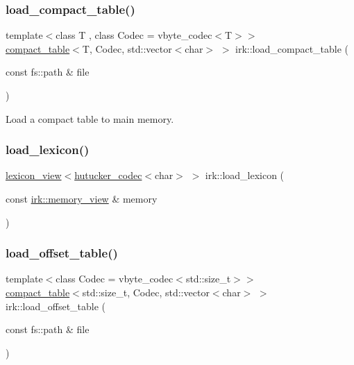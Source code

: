 \mbox{\label{namespaceirk_af5d69d1a8b720ed220cac2ba35bf704f}} 
\subsubsection{\texorpdfstring{load\+\_\+compact\+\_\+table()}{load\_compact\_table()}}
{\footnotesize\ttfamily template$<$class T , class Codec  = vbyte\+\_\+codec$<$\+T$>$$>$ \\
\mbox{\hyperlink{classirk_1_1compact__table}{compact\+\_\+table}}$<$T, Codec, std\+::vector$<$char$>$ $>$ irk\+::load\+\_\+compact\+\_\+table (\begin{DoxyParamCaption}\item[{const fs\+::path \&}]{file }\end{DoxyParamCaption})}



Load a compact table to main memory. 

\mbox{\label{namespaceirk_a34aaa6d3890f73c7d082ddbd78340875}} 
\subsubsection{\texorpdfstring{load\+\_\+lexicon()}{load\_lexicon()}}
{\footnotesize\ttfamily \mbox{\hyperlink{namespaceirk_ab1814afdb97c1b326d1d549beedf9be8}{lexicon\+\_\+view}}$<$\mbox{\hyperlink{classirk_1_1hutucker__codec}{hutucker\+\_\+codec}}$<$char$>$ $>$ irk\+::load\+\_\+lexicon (\begin{DoxyParamCaption}\item[{const \mbox{\hyperlink{classirk_1_1memory__view}{irk\+::memory\+\_\+view}} \&}]{memory }\end{DoxyParamCaption})\hspace{0.3cm}{\ttfamily [inline]}}

\mbox{\label{namespaceirk_ac8015c27262d287ddb9092a9b4278750}} 
\subsubsection{\texorpdfstring{load\+\_\+offset\+\_\+table()}{load\_offset\_table()}}
{\footnotesize\ttfamily template$<$class Codec  = vbyte\+\_\+codec$<$std\+::size\+\_\+t$>$$>$ \\
\mbox{\hyperlink{classirk_1_1compact__table}{compact\+\_\+table}}$<$std\+::size\+\_\+t, Codec, std\+::vector$<$char$>$ $>$ irk\+::load\+\_\+offset\+\_\+table (\begin{DoxyParamCaption}\item[{const fs\+::path \&}]{file }\end{DoxyParamCaption})}



